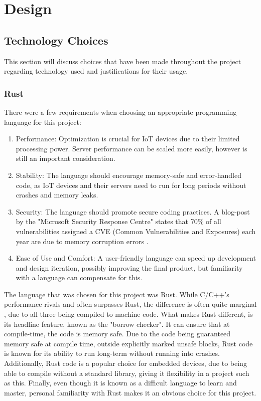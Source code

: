 \chapter{Design} \label{cha:design}
\section{Technology Choices} \label{sec:chapdesign:technology}
This section will discuss choices that have been made throughout the project regarding technology used and justifications for their usage.

\subsection{Rust} \label{sec:chapdesign:technology:rust}
There were a few requirements when choosing an appropriate programming language for this project:
\begin{enumerate} 
    \item Performance: Optimization is crucial for IoT devices due to their limited processing power. Server performance can be scaled more easily, however is still an important consideration.
    \item Stability: The language should encourage memory-safe and error-handled code, as IoT devices and their servers need to run for long periods without crashes and memory leaks.
    \item Security: The language should promote secure coding practices. A blog-post by the "Microsoft Security Response Centre" states that 70\% of all vulnerabilities assigned a CVE (Common Vulnerabilities and Exposures) each year are due to memory corruption errors \cite{ProactiveApproachToSecureCode}.
    \item Ease of Use and Comfort: A user-friendly language can speed up development and design iteration, possibly improving the final product, but familiarity with a language can compensate for this.

\end{enumerate}
The language that was chosen for this project was Rust. While C/C++'s performance rivals and often surpasses Rust, the difference is often quite marginal \cite{PerformanceEvalOnMicrocontroller}, due to all three being compiled to machine code. What makes Rust different, is its headline feature, known as the "borrow checker". It can ensure that at compile-time, the code is memory safe. Due to the code being guaranteed memory safe at compile time, outside explicitly marked unsafe blocks, Rust code is known for its ability to run long-term without running into crashes. Additionally, Rust code is a popular choice for embedded devices, due to being able to compile without a standard library, giving it flexibility in a project such as this. Finally, even though it is known as a difficult language to learn and master, personal familiarity with Rust makes it an obvious choice for this project.

